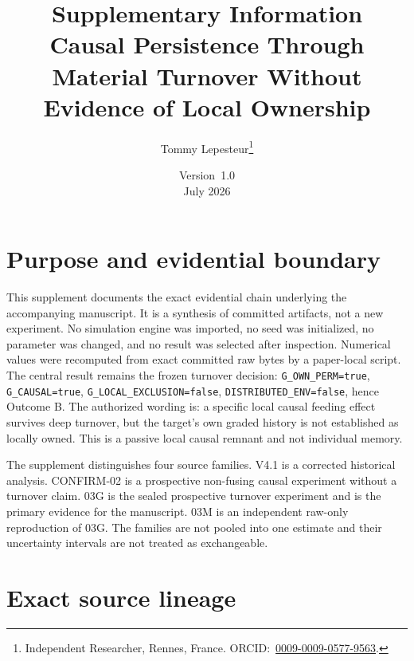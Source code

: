 \documentclass[10pt]{article}
\title{Supplementary Information\\\large Causal Persistence Through Material Turnover Without Evidence of Local Ownership}
\author{Tommy Lepesteur\thanks{Independent Researcher, Rennes, France. ORCID:~\href{https://orcid.org/0009-0009-0577-9563}{0009-0009-0577-9563}.}}
\date{Version~1.0\\July 2026}
\newcommand{\code}[1]{\texttt{#1}}
\begin{document}
\maketitle
\tableofcontents

\section{Purpose and evidential boundary}

This supplement documents the exact evidential chain underlying the accompanying manuscript. It is a synthesis of committed artifacts, not a new experiment. No simulation engine was imported, no seed was initialized, no parameter was changed, and no result was selected after inspection. Numerical values were recomputed from exact committed raw bytes by a paper-local script. The central result remains the frozen turnover decision: \code{G\_OWN\_PERM=true}, \code{G\_CAUSAL=true}, \code{G\_LOCAL\_EXCLUSION=false}, \code{DISTRIBUTED\_ENV=false}, hence Outcome B. The authorized wording is: a specific local causal feeding effect survives deep turnover, but the target's own graded history is not established as locally owned. This is a passive local causal remnant and not individual memory.

The supplement distinguishes four source families. V4.1 is a corrected historical analysis. CONFIRM-02 is a prospective non-fusing causal experiment without a turnover claim. 03G is the sealed prospective turnover experiment and is the primary evidence for the manuscript. 03M is an independent raw-only reproduction of 03G. The families are not pooled into one estimate and their uncertainty intervals are not treated as exchangeable.

\section{Exact source lineage}
\end{document}
